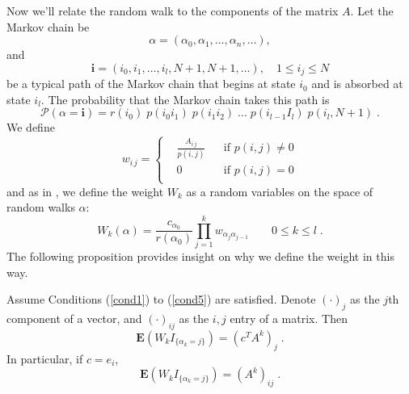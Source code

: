         Now we'll relate the random walk to the components of the matrix $A$.
        Let the Markov chain be
        \[ \alpha =
            \left( \alpha_0, \alpha_1, \ldots, \alpha_n, \ldots \right),
        \]
        and
        \[ \mathbf{i} =
            \left( i_0, i_1, \ldots , i_l, N+1, N+1, \ldots \right),
            \quad 1\le i_j\le N
        \]
        be a typical path of the Markov chain that begins at state $i_0$ and
        is absorbed at state $i_l$.  The probability that the Markov chain
        takes this path is
        \[ \mathcal{P}(\alpha=\mathbf{i}) =
            r(i_0) \; p(i_0 i_1) \; p(i_1 i_2) \; \ldots \;
            p(i_{l-1} I_l) \; p(i_l,N+1) \;.
        \]
        We define
        \[ w_{i\,j} = \left\{ \begin{aligned}
                & \frac{A_{i\,j}}{p(i,j)} && \mbox{if } p(i,j) \ne 0 \\
                & 0                       && \mbox{if } p(i,j)  =  0 \\
            \end{aligned} \right.
        \]
        and as in \cite[]{Okten2005}, we define the weight $W_k$ as a random
        variables on the space of random walks $\alpha$:
        \begin{equation} \label{W}
            W_k(\alpha) =
            \frac{c_{\alpha_0}}{r(\alpha_0)}
            \prod_{j=1}^k w_{\alpha_j \alpha_{j-1}} \qquad 0 \le k \le l \;.
        \end{equation}
        The following proposition provides insight on why we define the weight
        in this way.
        \begin{proposition} \label{prop}
            Assume Conditions (\ref{cond1}) to (\ref{cond5}) are satisfied.
            Denote $(\cdot)_j$ as the $j$th component of a vector, and
            $(\cdot)_{i j}$ as the $i,j$ entry of a matrix.  Then
            \begin{equation} \label{approx}
             \mathbf{E}( W_k I_{\{\alpha_k = j\}} ) = \left(c^T A^k\right)_j \;.
            \end{equation}
            In particular, if $c = e_i$,
            \begin{equation} \label{matapprox}
             \mathbf{E}( W_k I_{\{\alpha_k = j\}} ) = \left(A^k\right)_{i j} \;.
            \end{equation}
        \end{proposition}
